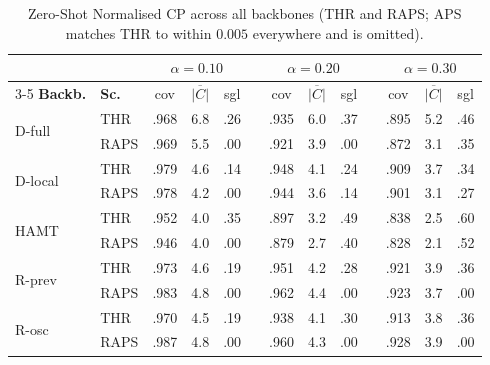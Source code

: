 \begin{table}[t]
\centering
\caption{Zero-Shot Normalised CP across all backbones (THR and RAPS; APS matches THR to within $0.005$ everywhere and is omitted).}
\label{tab:main}
\setlength{\tabcolsep}{2.6pt}\scriptsize
\renewcommand{\arraystretch}{0.93}%
\begin{tabular}{ll ccc c ccc c ccc}
\toprule
& & \multicolumn{3}{c}{$\alpha{=}0.10$} & &
    \multicolumn{3}{c}{$\alpha{=}0.20$} & &
    \multicolumn{3}{c}{$\alpha{=}0.30$} \\
\cmidrule{3-5}\cmidrule{7-9}\cmidrule{11-13}
\textbf{Backb.} & \textbf{Sc.}
 & cov & $\overline{|C|}$ & sgl & & cov & $\overline{|C|}$ & sgl
 & & cov & $\overline{|C|}$ & sgl \\
\midrule
\multirow{2}{*}{D-full}
 & THR  & .968 & 6.8 & .26 & & .935 & 6.0 & .37 & & .895 & 5.2 & .46 \\
 & RAPS & .969 & 5.5 & .00 & & .921 & 3.9 & .00 & & .872 & 3.1 & .35 \\
\midrule
\multirow{2}{*}{D-local}
 & THR  & .979 & 4.6 & .14 & & .948 & 4.1 & .24 & & .909 & 3.7 & .34 \\
 & RAPS & .978 & 4.2 & .00 & & .944 & 3.6 & .14 & & .901 & 3.1 & .27 \\
\midrule
\multirow{2}{*}{HAMT}
 & THR  & .952 & 4.0 & .35 & & .897 & 3.2 & .49 & & .838 & 2.5 & .60 \\
 & RAPS & .946 & 4.0 & .00 & & .879 & 2.7 & .40 & & .828 & 2.1 & .52 \\
\midrule
\multirow{2}{*}{R-prev}
 & THR  & .973 & 4.6 & .19 & & .951 & 4.2 & .28 & & .921 & 3.9 & .36 \\
 & RAPS & .983 & 4.8 & .00 & & .962 & 4.4 & .00 & & .923 & 3.7 & .00 \\
\midrule
\multirow{2}{*}{R-osc}
 & THR  & .970 & 4.5 & .19 & & .938 & 4.1 & .30 & & .913 & 3.8 & .36 \\
 & RAPS & .987 & 4.8 & .00 & & .960 & 4.3 & .00 & & .928 & 3.9 & .00 \\
\bottomrule
\end{tabular}
\end{table}
